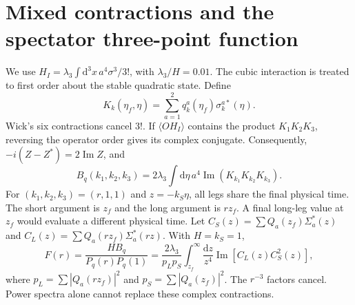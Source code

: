 \documentclass[11pt,a4paper]{article}
\newcommand{\dd}{\mathrm{d}}
\begin{document}
\section{Mixed contractions and the spectator three-point function}
We use $H_I=\lambda_3\int\dd^3x\,a^4\sigma^3/3!$, with $\lambda_3/H=0.01$. The cubic interaction is treated to first order about the stable quadratic state. Define
\begin{equation}K_k(\eta_f,\eta)=\sum_{a=1}^2q_k^a(\eta_f)\sigma_k^{a*}(\eta).\end{equation}
Wick's six contractions cancel $3!$. If $\langle OH_I\rangle$ contains the product $K_1K_2K_3$, reversing the operator order gives its complex conjugate. Consequently, $-i(Z-Z^*)=2\operatorname{Im}Z$, and
\begin{equation}B_q(k_1,k_2,k_3)=2\lambda_3\int\dd\eta\,a^4\operatorname{Im}(K_{k_1}K_{k_2}K_{k_3}).\end{equation}
For $(k_1,k_2,k_3)=(r,1,1)$ and $z=-k_S\eta$, all legs share the final physical time. The short argument is $z_f$ and the long argument is $rz_f$. A final long-leg value at $z_f$ would evaluate a different physical time.
Let $C_S(z)=\sum Q_a(z_f)\Sigma_a^*(z)$ and $C_L(z)=\sum Q_a(rz_f)\Sigma_a^*(rz)$. With $H=k_S=1$,
\begin{equation}F(r)=\frac{HB_q}{P_q(r)P_q(1)}=\frac{2\lambda_3}{p_Lp_S}\int_{z_f}^{\infty}\frac{\dd z}{z^4}\operatorname{Im}[C_L(z)C_S^2(z)],\end{equation}
where $p_L=\sum|Q_a(rz_f)|^2$ and $p_S=\sum|Q_a(z_f)|^2$. The $r^{-3}$ factors cancel. Power spectra alone cannot replace these complex contractions.

\newpage
\end{document}
